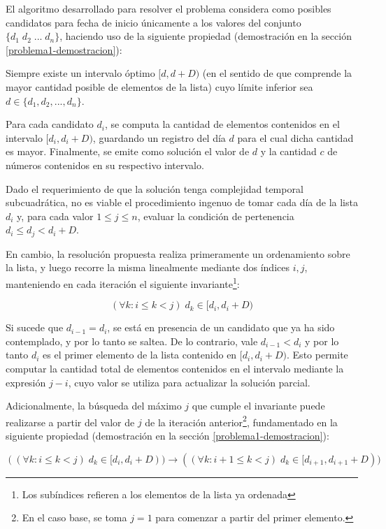 El algoritmo desarrollado para resolver el problema considera como posibles candidatos para fecha de inicio únicamente a los valores del conjunto $\{d_1\;d_2\;...\;d_n\}$, haciendo uso de la siguiente propiedad (demostración en la sección \ref{problema1-demostracion}):

\begin{propiedad}\label{propiedad-candidatos}
Siempre existe un intervalo óptimo $[d, d + D)$ (en el sentido de que comprende la mayor cantidad posible de elementos de la lista) cuyo límite inferior sea $d \in \{d_1,d_2,...,d_n\}$.
\end{propiedad}

Para cada candidato $d_i$, se computa la cantidad de elementos contenidos en el intervalo $[d_i, d_i + D)$, guardando un registro del día $d$ para el cual dicha cantidad es mayor. Finalmente, se emite como solución el valor de $d$ y la cantidad $c$ de números contenidos en su respectivo intervalo.

Dado el requerimiento de que la solución tenga complejidad temporal subcuadrática, no es viable el procedimiento ingenuo de tomar cada día de la lista $d_i$ y, para cada valor $1 \leq j \leq n$, evaluar la condición de pertenencia $d_i \leq d_j < d_i + D$.

En cambio, la resolución propuesta realiza primeramente un ordenamiento sobre la lista, y luego recorre la misma linealmente mediante dos índices $i,j$, manteniendo en cada iteración el siguiente invariante\footnote{Los subíndices refieren a los elementos de la lista ya ordenada}:

$$(\forall k: i \leq k < j)\;d_k \in [d_i, d_i + D)$$

Si sucede que $d_{i-1} = d_i$, se está en presencia de un candidato que ya ha sido contemplado, y por lo tanto se saltea. De lo contrario, vale $d_{i-1} < d_i$ y por lo tanto $d_i$ es el primer elemento de la lista contenido en $[d_i, d_i + D)$. Esto permite computar la cantidad total de elementos contenidos en el intervalo mediante la expresión $j - i$, cuyo valor se utiliza para actualizar la solución parcial.

Adicionalmente, la búsqueda del máximo $j$ que cumple el invariante puede realizarse a partir del valor de $j$ de la iteración anterior\footnote{En el caso base, se toma $j = 1$ para comenzar a partir del primer elemento.}, fundamentado en la siguiente propiedad (demostración en la sección \ref{problema1-demostracion}):

\begin{propiedad}\label{propiedad-maximo-j}
$$((\forall k: i \leq k < j)\;d_k \in [d_i, d_i + D)) \rightarrow ((\forall k: i + 1 \leq k < j)\;d_k \in [d_{i+1}, d_{i+1} + D))$$
\end{propiedad}

